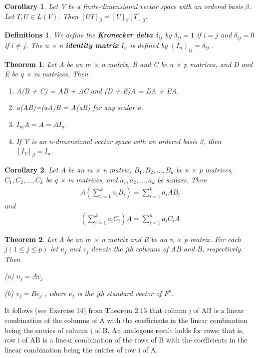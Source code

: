\documentclass{article}
\newcommand{\bd}[1]{\textbf{#1}}
\theoremstyle{plain}
\newtheorem{theorem}{Theorem}[section]
\newtheorem*{corollary}{Corollary}
\newtheorem*{definitions}{Definitions}
\theoremstyle{plain} %
\begin{document}
\begin{corollary}
Let V be a finite-dimensional vector space with an ordered basis $\beta$. Let $T,U \in L(V)$. Then $[UT]_\beta = [U]_\beta[T]_\beta$.
\end{corollary}

\begin{definitions}
We define the \bd{Kronecker delta} $\delta_{ij}$ by $\delta_{ij} = 1$ if $i = j$ and $\delta_{ij} = 0$ if $i \neq j$. The n × n \bd{identity matrix} $I_n$ is defined by $(I_n)_{ij} = \delta_{ij}$ .
\end{definitions}

\begin{theorem}
Let A be an m × n matrix, B and C be n × p matrices, and D and E be q × m matrices. Then
\begin{enumerate}[label=(\alph*)]
\item A(B + C) = AB + AC and (D + E)A = DA + EA.
\item a(AB)=(aA)B = A(aB) for any scalar a.
\item $I_mA = A = AI_n$.
\item If V is an n-dimensional vector space with an ordered basis $\beta$, then $[I_V]_\beta = I_n$.
\end{enumerate}
\end{theorem}

\begin{corollary}
Let A be an m × n matrix, $B_1, B_2,...,B_k$ be n × p matrices, $C_1, C_2,...,C_k$ be q × m matrices, and $a_1, a_2,...,a_k$ be scalars. Then
\begin{align*}
A\left(\sum_{i=1}^ka_iB_i\right)=\sum_{i=1}^ka_iAB_i
\end{align*}
and
\begin{align*}
\left(\sum_{i=1}^ka_iC_i\right)A=\sum_{i=1}^na_iC_iA
\end{align*}
\end{corollary}

\begin{theorem}
Let A be an m × n matrix and B be an n × p matrix. For each $j (1 \leq j \leq p)$ let $u_j$ and $v_j$ denote the jth columns of AB and B, respectively. Then

(a) $u_j = Av_j$

(b) $v_j = Be_j$ , where $e_j$ is the jth standard vector of $F^p$.

\end{theorem}

It follows (see Exercise 14) from Theorem 2.13 that column j of AB is a linear combination of the columns of A with the coefficients in the linear combination being the entries of column j of B. An analogous result holds for rows; that is, row i of AB is a linear combination of the rows of B with the coefficients in the linear combination being the entries of row i of A.
\end{document}
